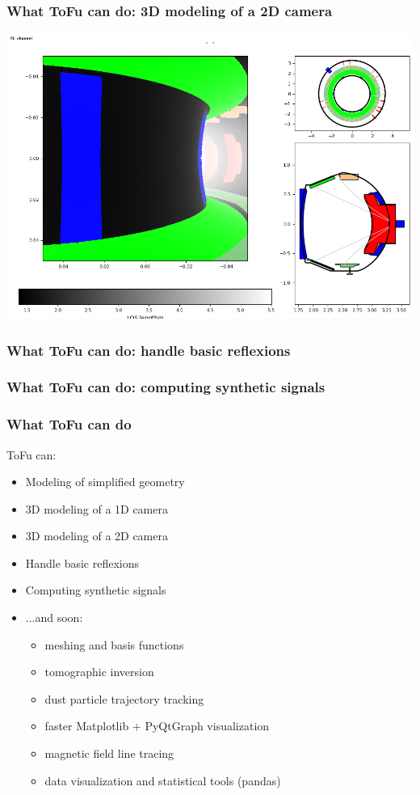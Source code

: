 \documentclass[10pt]{beamer}
\begin{document}
\begin{frame}
\frametitle{What ToFu can do: 3D modeling of a 2D camera}
		\begin{center}
		\includegraphics[width=\textwidth]{figures/cam2d.png}
	\end{center}	
\end{frame}

\begin{frame}
\frametitle{What ToFu can do: handle basic reflexions}
	
\end{frame}

\begin{frame}
\frametitle{What ToFu can do: computing synthetic signals}
	
\end{frame}

\begin{frame}
\frametitle{What ToFu can do}
ToFu can:
\begin{itemize}
	\item Modeling of simplified geometry
	\item 3D modeling of a 1D camera
	\item 3D modeling of a 2D camera
	\item Handle basic reflexions
	\item Computing synthetic signals
	\item ...and soon:
		\begin{itemize}
			\item meshing and basis functions
			\item tomographic inversion
			\item dust particle trajectory tracking
			\item faster Matplotlib + PyQtGraph visualization
			\item magnetic field line tracing
			\item data visualization and statistical tools (pandas)
		\end{itemize}
\end{itemize}
\end{frame}
\end{document}
